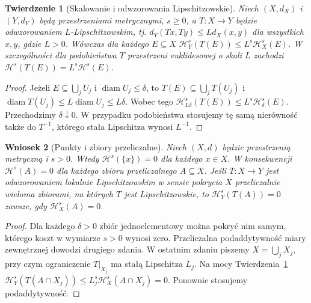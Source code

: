 \documentclass[11pt,a4paper,oneside]{book}
\numberwithin{equation}{chapter}
\theoremstyle{plain}
\newtheorem{twierdzenie}{Twierdzenie}[chapter]
\newtheorem{wniosek}[twierdzenie]{Wniosek}
\theoremstyle{definition}
\theoremstyle{remark}
\begin{document}
\begin{twierdzenie}[Skalowanie i odwzorowania Lipschitzowskie]
\label{thm:hausdorff-lipschitz-26}
Niech $(X,d_X)$ i $(Y,d_Y)$ będą przestrzeniami
metrycznymi, $s\ge0$, a $T:X\to Y$ będzie
odwzorowaniem $L$-Lipschitzowskim, tj.
$d_Y(Tx,Ty)\le Ld_X(x,y)$ dla wszystkich $x,y$,
gdzie $L>0$. Wówczas dla każdego $E\subseteq X$
$\mathcal H_Y^s(T(E))\le L^s\mathcal H_X^s(E)$.
W szczególności dla podobieństwa $T$ przestrzeni
euklidesowej o skali $L$ zachodzi
$\mathcal H^s(T(E))=L^s\mathcal H^s(E)$.
\end{twierdzenie}
\begin{proof}
Jeżeli $E\subseteq\bigcup_jU_j$ i
$\operatorname{diam}U_j\le\delta$, to
$T(E)\subseteq\bigcup_jT(U_j)$ i
$\operatorname{diam}T(U_j)\le L\operatorname{diam}U_j
\le L\delta$. Wobec tego
$\mathcal H^s_{L\delta}(T(E))\le
L^s\mathcal H^s_\delta(E)$.
Przechodzimy $\delta\downarrow0$. W przypadku
podobieństwa stosujemy tę samą nierówność także do
$T^{-1}$, którego stała Lipschitza wynosi $L^{-1}$.
\end{proof}

\begin{wniosek}[Punkty i zbiory przeliczalne]
\label{cor:hausdorff-singletons-auditVI}
Niech $(X,d)$ będzie przestrzenią metryczną i $s>0$.
Wtedy $\mathcal H^s(\{x\})=0$ dla każdego $x\in X$.
W konsekwencji $\mathcal H^s(A)=0$ dla każdego zbioru
przeliczalnego $A\subseteq X$. Jeśli $T:X\to Y$ jest
odwzorowaniem lokalnie Lipschitzowskim w sensie pokrycia
$X$ przeliczalnie wieloma zbiorami, na których $T$
jest Lipschitzowskie, to
$\mathcal H_Y^s(T(A))=0$ zawsze, gdy $\mathcal H_X^s(A)=0$.
\end{wniosek}
\begin{proof}
Dla każdego $\delta>0$ zbiór jednoelementowy
można pokryć nim samym, którego koszt w wymiarze
$s>0$ wynosi zero. Przeliczalna podaddytywność
miary zewnętrznej dowodzi drugiego zdania.
W ostatnim zdaniu piszemy $X=\bigcup_jX_j$,
przy czym ograniczenie $T|_{X_j}$ ma stałą
Lipschitza $L_j$. Na mocy
Twierdzenia~\ref{thm:hausdorff-lipschitz-26}
$\mathcal H_Y^s(T(A\cap X_j))\le
L_j^s\mathcal H_X^s(A\cap X_j)=0$.
Ponownie stosujemy podaddytywność.
\end{proof}
\end{document}
